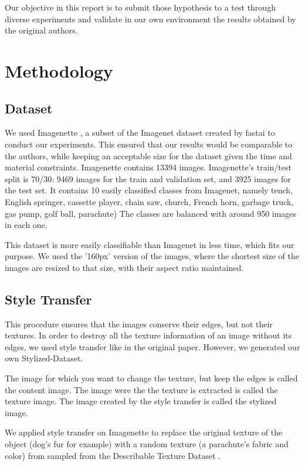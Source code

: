 \documentclass{article}
\begin{document}
\noindent
Our objective in this report is to submit those hypothesis to a test through diverse experiments 
and validate in our own environment the results obtained by the original authors.

\newpage
\section{Methodology}

\subsection{Dataset}

We used Imagenette \cite{fastai2019}, a subset of the Imagenet dataset created 
by fastai to conduct our experiments.
This ensured that our results would be comparable to the authors, 
while keeping an acceptable size for the dataset given the time and material constraints.
Imagenette contains 13394 images.
Imagenette's train/test split is 70/30: 9469 images for the train and validation set, and 3925 images for the test set.
It contains 10 easily classified classes from Imagenet, namely
tench, English springer, cassette player, chain saw, church, French horn, garbage truck, gas pump, golf ball, parachute)
The classes are balanced with around 950 images in each one.

This dataset is more easily classifiable than Imagenet in less time, which fits our purpose.
We used the '160px' version of the images, where the shortest size of the images are resized to that size, 
with their aspect ratio maintained.


\subsection{Style Transfer}

This procedure ensures that the images conserve their edges, but not their textures.
In order to destroy all the texture information of an image without its edges, we used style transfer like in
the original paper.
However, we generated our own Stylized-Dataset. \smallskip

\noindent
The image for which you want to change the texture, but keep the edges is called the content image.
The image were the the texture is extracted is called the texture image.
The image created by the style transfer is called the stylized image. \smallskip

\noindent
We applied style transfer on Imagenette to replace the original texture of the object (dog's fur for example) 
with a random texture (a parachute's fabric and color) 
from sampled from the Describable Texture Dataset \cite{cimpoi14describing}. \smallskip
\end{document}
